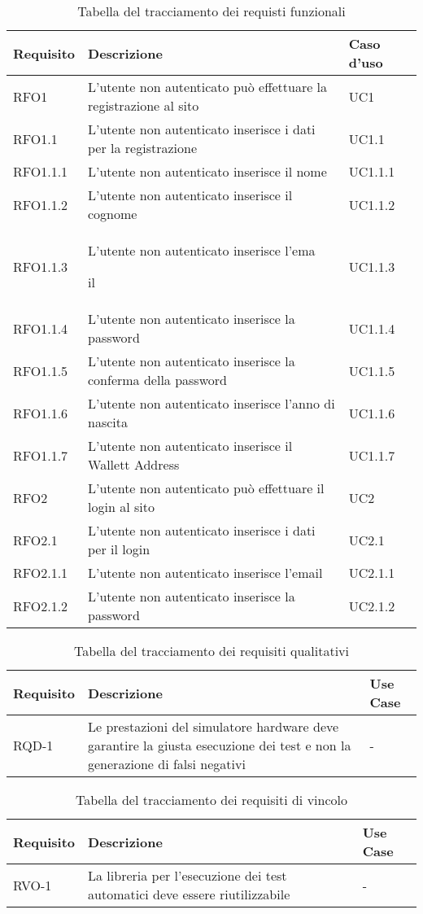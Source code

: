 \begin{table}[H]
\caption{Tabella del tracciamento dei requisti funzionali}
\label{tab:requisiti-funzionali}
\begin{tabularx}{\textwidth}{lXl}
\hline\hline
\textbf{Requisito} & \textbf{Descrizione} & \textbf{Caso d'uso}\\
\hline
RFO1 & L'utente non autenticato può effettuare la registrazione al sito & UC1 \\
\hline
RFO1.1 & L'utente non autenticato inserisce i dati per la registrazione & UC1.1 \\
\hline
RFO1.1.1 & L'utente non autenticato inserisce il nome & UC1.1.1 \\
\hline
RFO1.1.2 & L'utente non autenticato inserisce il cognome & UC1.1.2 \\
\hline
RFO1.1.3 & L'utente non autenticato inserisce l'ema

il & UC1.1.3 \\
\hline
RFO1.1.4 & L'utente non autenticato inserisce la password & UC1.1.4 \\
\hline
RFO1.1.5 & L'utente non autenticato inserisce la conferma della password & UC1.1.5 \\
\hline
RFO1.1.6 & L'utente non autenticato inserisce l'anno di nascita & UC1.1.6 \\
\hline
RFO1.1.7 & L'utente non autenticato inserisce il Wallett Address & UC1.1.7 \\
\hline
RFO2 & L'utente non autenticato può effettuare il login al sito & UC2 \\
\hline
RFO2.1 &L'utente non autenticato inserisce i dati per il login & UC2.1 \\
\hline
RFO2.1.1 & L'utente non autenticato inserisce l'email & UC2.1.1 \\
\hline
RFO2.1.2 & L'utente non autenticato inserisce  la password & UC2.1.2 \\
\hline
\end{tabularx}
\end{table}%

\begin{table}[H]
\caption{Tabella del tracciamento dei requisiti qualitativi}
\label{tab:requisiti-qualitativi}
\begin{tabularx}{\textwidth}{lXl}
\hline\hline
\textbf{Requisito} & \textbf{Descrizione} & \textbf{Use Case}\\
\hline
RQD-1    & Le prestazioni del simulatore hardware deve garantire la giusta esecuzione dei test e non la generazione di falsi negativi & - \\
\hline
\end{tabularx}
\end{table}%

\begin{table}[H]
\caption{Tabella del tracciamento dei requisiti di vincolo}
\label{tab:requisiti-vincolo}
\begin{tabularx}{\textwidth}{lXl}
\hline\hline
\textbf{Requisito} & \textbf{Descrizione} & \textbf{Use Case}\\
\hline
RVO-1    & La libreria per l'esecuzione dei test automatici deve essere riutilizzabile & - \\
\hline
\end{tabularx}
\end{table}%